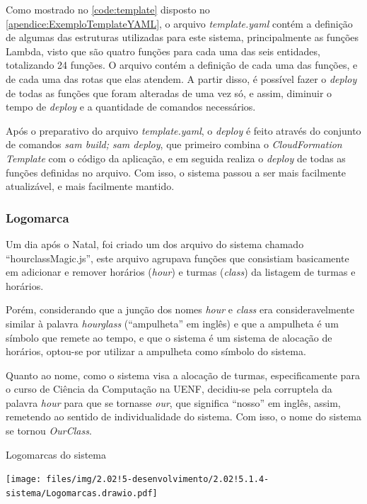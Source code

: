 Como mostrado no \autoref{code:template} disposto no \autoref{apendice:ExemploTemplateYAML}, o arquivo \textit{template.yaml} contém a definição de algumas das estruturas utilizadas para este sistema, principalmente as funções Lambda, visto que são quatro funções para cada uma das seis entidades, totalizando 24 funções. O arquivo contém a definição de cada uma das funções, e de cada uma das rotas que elas atendem. A partir disso, é possível fazer o \textit{deploy} de todas as funções que foram alteradas de uma vez só, e assim, diminuir o tempo de \textit{deploy} e a quantidade de comandos necessários.

Após o preparativo do arquivo \textit{template.yaml}, o \textit{deploy} é feito através do conjunto de comandos \textit{sam build; sam deploy}, que primeiro combina o \textit{CloudFormation Template} com o código da aplicação, e em seguida realiza o \textit{deploy} de todas as funções definidas no arquivo. Com isso, o sistema passou a ser mais facilmente atualizável, e mais facilmente mantido.

\subsubsection{Logomarca} \label{sssec:Logomarca}

Um dia após o Natal, foi criado um dos arquivo do sistema chamado ``hourclassMagic.js'', este arquivo agrupava funções que consistiam basicamente em adicionar e remover horários (\textit{hour}) e turmas (\textit{class}) da listagem de turmas e horários.

Porém, considerando que a junção dos nomes \textit{hour} e \textit{class} era consideravelmente similar à palavra \textit{hourglass} (``ampulheta'' em inglês) e que a ampulheta é um símbolo que remete ao tempo, e que o sistema é um sistema de alocação de horários, optou-se por utilizar a ampulheta como símbolo do sistema.

Quanto ao nome, como o sistema visa a alocação de turmas, especificamente para o curso de Ciência da Computação na UENF, decidiu-se pela corruptela da palavra \textit{hour} para que se tornasse \textit{our}, que significa ``nosso'' em inglês, assim, remetendo ao sentido de individualidade do sistema. Com isso, o nome do sistema se tornou \textit{OurClass}.

\begin{MyCenteredFigure} \caption{Logomarcas do sistema} \label{fig:Logomarcas}
  \texttt{[image: files/img/2.02!5-desenvolvimento/2.02!5.1.4-sistema/Logomarcas.drawio.pdf]}
\end{MyCenteredFigure}


